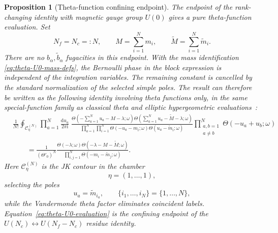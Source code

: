 \documentclass[11pt,a4paper]{article}
\numberwithin{equation}{section}
\theoremstyle{plain}
\newtheorem{proposition}[theorem]{Proposition}
\theoremstyle{definition}
\theoremstyle{remark}
\newcommand{\ii}{\mathrm{i}}
\begin{document}
\begin{proposition}[Theta-function confining endpoint]
\label{prop:theta-U0-confining-endpoint}
The endpoint of the rank-changing identity with magnetic gauge group \(U(0)\) gives a
pure theta-function evaluation.  Set
\begin{equation}
N_f=N_c=:N,
\qquad
M=\sum_{i=1}^{N}m_i,
\qquad
\widetilde M=\sum_{i=1}^{N}\widetilde m_i .
\label{eq:theta-U0-mass-defs}
\end{equation}
There are no \(b_\alpha,\widetilde b_\alpha\) fugacities in this endpoint.  With the mass
identification \eqref{eq:theta-U0-mass-defs}, the Bernoulli phase in the block expression is
independent of the integration variables.  The remaining constant is cancelled by the standard
normalization of the selected simple poles.  The result can therefore be written as the following
identity involving theta functions only, in the same special-function family as classical theta and elliptic hypergeometric evaluations~\cite{Spiridonov:2001ig,Rains:2003}:
\begin{equation}
\begin{aligned}
&\frac{1}{N!}
\oint_{\mathcal C_{\eta}^{(N)}}
\prod_{a=1}^{N}
\frac{\mathrm d u_a}{2\pi\ii}\;
\frac{
\Theta\!\left(-\sum_{a=1}^{N}u_a-M-\lambda;\omega\right)
\Theta\!\left(\sum_{a=1}^{N}u_a-\widetilde M-\lambda;\omega\right)
}{
\displaystyle\prod_{a=1}^{N}\prod_{i=1}^{N}
\Theta(-u_a-m_i;\omega)
\Theta(u_a-\widetilde m_i;\omega)
}
\prod_{\substack{a,b=1\\ a\neq b}}^{N}
\Theta(-u_a+u_b;\omega)
\\[1mm]
&\qquad =
\frac{1}{(\Theta'_0)^N}
\frac{
\Theta(-\lambda;\omega)
\Theta(-\lambda-M-\widetilde M;\omega)
}{
\displaystyle\prod_{i,j=1}^{N}
\Theta(-m_i-\widetilde m_j;\omega)
} .
\end{aligned}
\label{eq:theta-U0-evaluation}
\end{equation}
Here \(\mathcal C_{\eta}^{(N)}\) is the JK contour in the chamber
\begin{equation}
\eta=(1,\ldots,1),
\end{equation}
selecting the poles
\begin{equation}
u_a=\widetilde m_{i_a},
\qquad
\{i_1,\ldots,i_N\}=\{1,\ldots,N\},
\label{eq:theta-U0-selected-poles}
\end{equation}
while the Vandermonde theta factor eliminates coincident labels.  Equation~\eqref{eq:theta-U0-evaluation}
is the confining endpoint of the \(U(N_c)\leftrightarrow U(N_f-N_c)\) residue identity.
\end{proposition}
\end{document}
